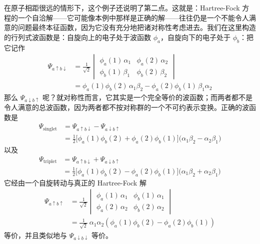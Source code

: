 在原子相距很远的情形下，这个例子还说明了第二点。这就是：Hartree-Fock 方程的一个自洽解——它可能像本例中那样是正确的解——往往仍是一个不能令人满意的问题最终本征函数，因为它没有充分地把诸对称性考虑进去。我们在这里构造的行列式波函数是：自旋向上的电子处于波函数 $\phi_a$，自旋向下的电子处于 $\phi_b$：把它记作
\begin{align*}
\Psi_{a\uparrow b\downarrow}&=\frac{1}{\sqrt{2}}
\begin{vmatrix}
\phi_a(1)\,\alpha_1 & \phi_a(2)\,\alpha_2\\
\phi_b(1)\,\beta_1 & \phi_b(2)\,\beta_2
\end{vmatrix}\\
&=\phi_a(1)\phi_b(2)\,\alpha_1\beta_2-\phi_a(2)\phi_b(1)\,\beta_1\alpha_2
\end{align*}
那么 $\Psi_{a\downarrow b\uparrow}$ 呢？就对称性而言，它其实是一个完全等价的波函数；而两者都不是令人满意的总波函数，因为两者都不按对称群的一个不可约表示变换。正确的波函数是
\begin{align*}
\Psi_{\text{singlet}}&=\Psi_{a\uparrow b\downarrow}-\Psi_{a\downarrow b\uparrow}\\
&=\frac{1}{2}\Big[\phi_a(1)\phi_b(2)+\phi_a(2)\phi_b(1)\Big]\big(\alpha_1\beta_2-\alpha_2\beta_1\big)
\end{align*}
以及
\begin{align*}
\Psi_{\text{triplet}}&=\Psi_{a\uparrow b\downarrow}+\Psi_{a\downarrow b\uparrow}\\
&=\frac{1}{2}\Big[\phi_a(1)\phi_b(2)-\phi_a(2)\phi_b(1)\Big]\big(\alpha_1\beta_2+\alpha_2\beta_1\big)
\end{align*}
它经由一个自旋转动与真正的 Hartree-Fock 解
\begin{align*}
\Psi_{a\uparrow b\uparrow}&=\frac{1}{\sqrt{2}}
\begin{vmatrix}
\phi_a(1)\,\alpha_1 & \phi_b(1)\,\alpha_1\\
\phi_a(2)\,\alpha_2 & \phi_b(2)\,\alpha_2
\end{vmatrix}\\
&=\frac{1}{\sqrt{2}}\ \alpha_1\alpha_2\left(\phi_a(1)\phi_b(2)-\phi_a(2)\phi_b(1)\right)
\end{align*}
等价，并且类似地与 $\Psi_{a\downarrow b\downarrow}$ 等价。

